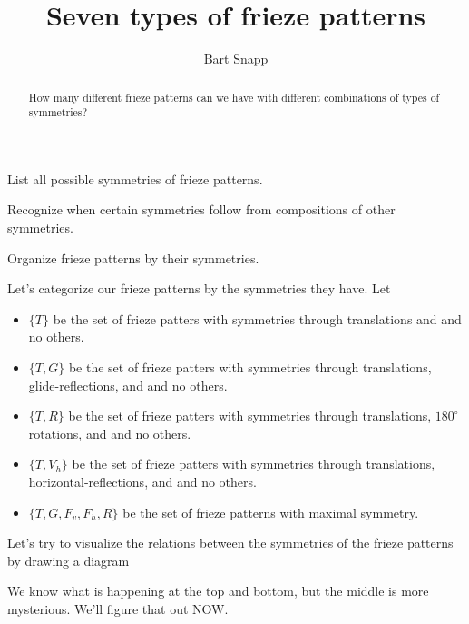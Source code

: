 \documentclass[noauthor,nooutcomes,12pt,hints,handout]{ximera}
\author{Bart Snapp}
\title{Seven types of frieze patterns}
\begin{document}
\begin{abstract}
  How many different frieze patterns can we have with different combinations of  types of symmetries?
\end{abstract}
\maketitle

\begin{listOutcomes}
\item List all possible symmetries of frieze patterns.
\item Recognize when certain symmetries follow from compositions of
  other symmetries.
\item Organize frieze patterns by their symmetries.
\end{listOutcomes}



Let's categorize our frieze patterns by the symmetries they have. Let
\begin{itemize}
  \item $\{T\}$ be the set of frieze patters with symmetries through
    translations and and no others.
  \item $\{T,G\}$ be the set of frieze patters with symmetries through
    translations, glide-reflections, and and no others.
  \item $\{T,R\}$ be the set of frieze patters with symmetries through
    translations, $180^\circ$ rotations, and and no others.
  \item $\{T,V_h\}$ be the set of frieze patters with symmetries
    through translations, horizontal-reflections, and and no
    others.
  \item $\{T,G,F_v,F_h,R\}$ be the set of frieze patterns with maximal
    symmetry.
\end{itemize}
Let's try to visualize the relations between the symmetries of the
frieze patterns by drawing a diagram
\begin{center}
\end{center}
We know what is happening at the top and bottom, but the middle is
more mysterious. We'll figure that out NOW.
\end{document}
